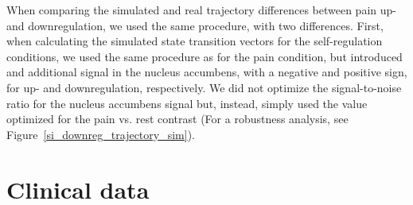 \documentclass{article}
\begin{document}
When comparing the simulated and real trajectory differences between pain up- and downregulation, we used the same procedure, with two differences. First, when calculating the simulated state transition vectors for the self-regulation conditions, we used the same procedure as for the pain condition, but introduced and additional signal in the nucleus accumbens, with a negative and positive sign, for  up- and downregulation, respectively. We did not optimize the signal-to-noise ratio for the nucleus accumbens signal but, instead, simply used the value optimized for the pain vs. rest contrast (For a robustness analysis, see Figure~\ref{si_downreg_trajectory_sim}).

\section{Clinical data}
\end{document}
